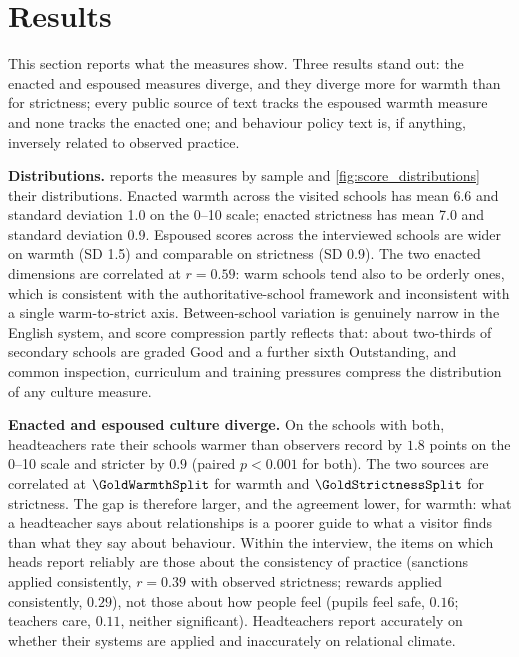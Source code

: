 
\section{Results}
\label{sec:p1_results}

This section reports what the measures show. Three results stand out: the
enacted and espoused measures diverge, and they diverge more for warmth than
for strictness; every public source of text tracks the espoused warmth measure
and none tracks the enacted one; and behaviour policy text is, if anything,
inversely related to observed practice.

\textbf{Distributions.}  reports the measures by sample
and \cref{fig:score_distributions} their distributions. Enacted warmth across
the \NTierOne{} visited schools has mean 6.6 and standard deviation 1.0 on the
0--10 scale; enacted strictness has mean 7.0 and standard deviation 0.9.
Espoused scores across the interviewed schools are wider on warmth (SD 1.5)
and comparable on strictness (SD 0.9). The two enacted dimensions are
correlated at $r = 0.59$: warm schools tend also to be orderly ones, which is
consistent with the authoritative-school framework and inconsistent with a
single warm-to-strict axis. Between-school variation is genuinely narrow in
the English system, and score compression partly reflects that: about
two-thirds of secondary schools are graded Good and a further sixth
Outstanding, and common inspection, curriculum and training pressures
compress the distribution of any culture measure.

\textbf{Enacted and espoused culture diverge.} On the \NTierOne{} schools
with both, headteachers rate their schools warmer than observers record by
$1.8$ points on the 0--10 scale and stricter by $0.9$ (paired
$p < 0.001$ for both). The two sources are correlated at $\GoldWarmthSplit$
for warmth and $\GoldStrictnessSplit$ for strictness. The gap is therefore
larger, and the agreement lower, for warmth: what a headteacher says about
relationships is a poorer guide to what a visitor finds than what they say
about behaviour. Within the interview, the items on which heads report
reliably are those about the consistency of practice (sanctions applied
consistently, $r = 0.39$ with observed strictness; rewards applied
consistently, $0.29$), not those about how people feel (pupils feel safe,
$0.16$; teachers care, $0.11$, neither significant). Headteachers report
accurately on whether their systems are applied and inaccurately on
relational climate.

